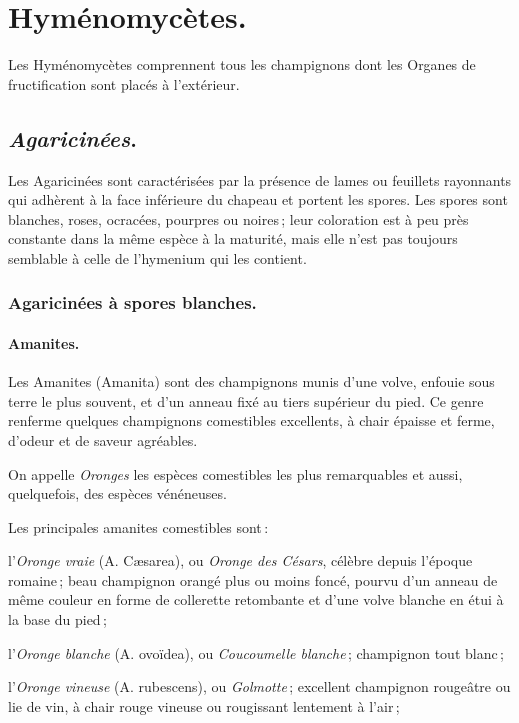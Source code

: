 \section*{\centering Hyménomycètes.}

Les Hyménomycètes comprennent tous les champignons dont les Organes de
fructification sont placés à l'extérieur.

\subsection*{\centering \textit{Agaricinées}.}

Les Agaricinées sont caractérisées par la présence de lames ou feuillets
rayonnants qui adhèrent à la face inférieure du chapeau et portent les spores.
Les spores sont blanches, roses, ocracées, pourpres ou noires ; leur coloration
est à peu près constante dans la même espèce à la maturité, mais elle n'est pas
toujours semblable à celle de l'hymenium qui les contient.

\subsubsection*{\centering \small\sc Agaricinées à spores blanches.}

\paragraph{Amanites.} 

Les Amanites (Amanita) sont des champignons munis d'une volve, enfouie sous
terre le plus souvent, et d'un anneau fixé au tiers supérieur du pied. Ce genre
renferme quelques champignons comestibles excellents, à chair épaisse et ferme,
d'odeur et de saveur agréables.

On appelle \textit{Oronges} les espèces comestibles les plus remarquables et
aussi, quelquefois, des espèces vénéneuses.

Les principales amanites comestibles sont :

l'\textit{Oronge vraie} (A. Cæsarea), ou \textit{Oronge des Césars}, célèbre
depuis l'époque romaine ; beau champignon orangé plus ou moins foncé, pourvu
d'un anneau de même couleur en forme de collerette retombante et d'une volve
blanche en étui à la base du pied ;

l'\textit{Oronge blanche} (A. ovoïdea), ou \textit{Coucoumelle blanche} ;
champignon tout blanc ;

l'\textit{Oronge vineuse} (A. rubescens), ou \textit{Golmotte} ; excellent
champignon rougeâtre ou lie de vin, à chair rouge vineuse ou rougissant
lentement à l'air ;

